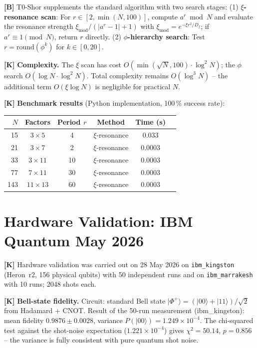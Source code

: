 \textbf{[B]} T0-Shor supplements the standard algorithm with two search stages:
(1) \textbf{$\xi$-resonance scan}: For $r\in[2,\min(N,100)]$, compute
$a^r\bmod N$ and evaluate the resonance strength
$\xi_\text{mod}/(|a^r-1|+1)$ with $\xi_\text{mod}=e^{-\xi r^2/D_f}$;
if $a^r\equiv1\pmod N$, return $r$ directly. (2) \textbf{$\phi$-hierarchy
search}: Test $r=\text{round}(\phi^k)$ for $k\in[0,20]$.

\textbf{[K]} \textbf{Complexity.} The $\xi$ scan has cost
$O(\min(\sqrt N,100)\cdot\log^2N)$; the $\phi$ search $O(\log N\cdot\log^2N)$.
Total complexity remains $O(\log^3N)$ -- the additional term
$O(\xi\log N)$ is negligible for practical $N$.

\textbf{[K]} \textbf{Benchmark results} (Python implementation, 100\,\% success rate):

\begin{center}
\renewcommand{\arraystretch}{1.3}
{\small
\begin{tabular}{rccccc}
\toprule
$N$ & Factors & Period $r$ & Method & Time (s) \\
\midrule
15  & $3\times5$   &  4 & $\xi$-resonance & 0.033 \\
21  & $3\times7$   &  2 & $\xi$-resonance & 0.0003 \\
33  & $3\times11$  & 10 & $\xi$-resonance & 0.0003 \\
77  & $7\times11$  & 30 & $\xi$-resonance & 0.0003 \\
143 & $11\times13$ & 60 & $\xi$-resonance & 0.0003 \\
\bottomrule
\end{tabular}
}
\renewcommand{\arraystretch}{1.0}
\end{center}

\section{Hardware Validation: IBM Quantum May 2026}

\textbf{[K]} Hardware validation was carried out on 28 May 2026 on
\texttt{ibm\_kingston} (Heron~r2, 156 physical qubits) with 50 independent
runs and on \texttt{ibm\_marrakesh} with 10 runs; 2048 shots each.

\textbf{[K]} \textbf{Bell-state fidelity.} Circuit: standard Bell state
$|\Phi^+\rangle=(|00\rangle+|11\rangle)/\sqrt2$ from Hadamard + CNOT. Result of
the 50-run measurement (ibm\_kingston): mean fidelity $0{.}9876\pm0{.}0028$,
variance $P(|00\rangle) = 1{.}249\times10^{-4}$. The chi-squared test against the
shot-noise expectation ($1{.}221\times10^{-4}$) gives $\chi^2=50{.}14$,
$p=0{.}856$ -- the variance is fully consistent with pure quantum shot noise.

